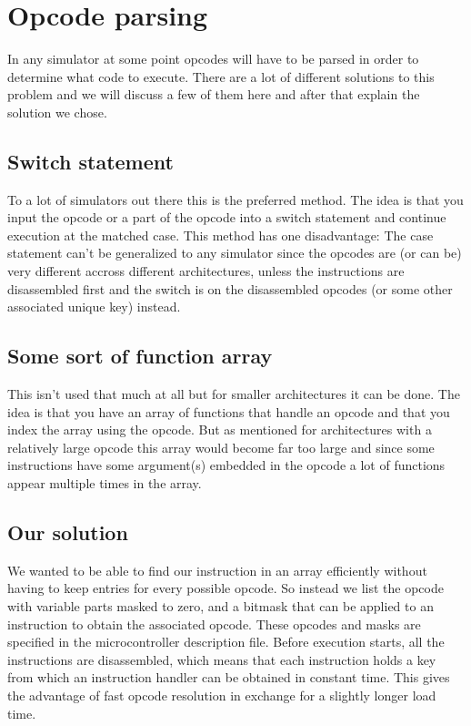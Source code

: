 \section[Opcode parsing]{Opcode parsing}
In any simulator at some point opcodes will have to be parsed in order
to determine what code to execute. There are a lot of different
solutions to this problem and we will discuss a few of them here and
after that explain the solution we chose.

\subsection[Switch statement]{Switch statement}
To a lot of simulators out there this is the preferred method. The idea
is that you input the opcode or a part of the opcode into a switch
statement and continue execution at the matched case. This method has
one disadvantage: The case statement can't be generalized to any
simulator since the opcodes are (or can be) very different accross
different architectures, unless the instructions are disassembled first and the
switch is on the disassembled opcodes (or some other associated unique key) instead.

\subsection{Some sort of function array}
This isn't used that much at all but for smaller architectures it can be
done. The idea is that you have an array of functions that handle an
opcode and that you index the array using the opcode. But as mentioned
for architectures with a relatively large opcode this array would
become far too large and since some instructions have some argument(s)
embedded in the opcode a lot of functions appear multiple times in the array.

\subsection{Our solution}
We wanted to be able to find our instruction in an array efficiently without
having to keep entries for every possible opcode. So instead we list the
opcode with variable parts masked to zero, and a bitmask that can be applied
to an instruction to obtain the associated opcode. These opcodes and masks are
specified in the microcontroller description file. Before execution starts,
all the instructions are disassembled, which means that each instruction holds
a key from which an instruction handler can be obtained in constant time. This gives the advantage of fast opcode resolution in exchange for a slightly longer load time. 


